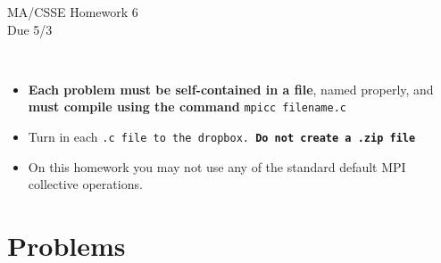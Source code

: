 \documentclass{article}
\begin{document}
\begin{center}
\Large{MA/CSSE Homework 6}\\
Due 5/3
\end{center}
\vspace{.25in}
\\
  \begin{itemize}
   \item \textbf{Each problem must be self-contained in a file}, named
     properly, and \textbf{must compile using the
      command} \texttt{mpicc filename.c}\\

  \item Turn in each \tt{.c} file to the dropbox. \textbf{Do not
      create a \tt{.zip} file}

  \item On this homework you may not use any of the standard default
    MPI collective operations. 
  \end{itemize}


\section*{Problems}
\end{document}
